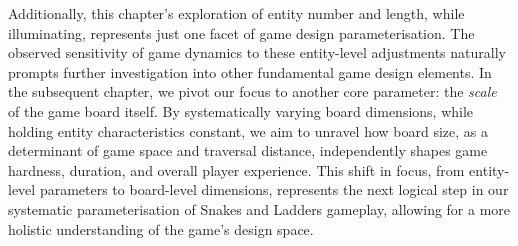 Additionally, this chapter's exploration of entity number and length, while illuminating, represents just one facet of game design parameterisation. The observed sensitivity of game dynamics to these entity-level adjustments naturally prompts further investigation into other fundamental game design elements. In the subsequent chapter, we pivot our focus to another core parameter: the \textit{scale} of the game board itself. By systematically varying board dimensions, while holding entity characteristics constant, we aim to unravel how board size, as a determinant of game space and traversal distance, independently shapes game hardness, duration, and overall player experience. This shift in focus, from entity-level parameters to board-level dimensions, represents the next logical step in our systematic parameterisation of Snakes and Ladders gameplay, allowing for a more holistic understanding of the game's design space.
